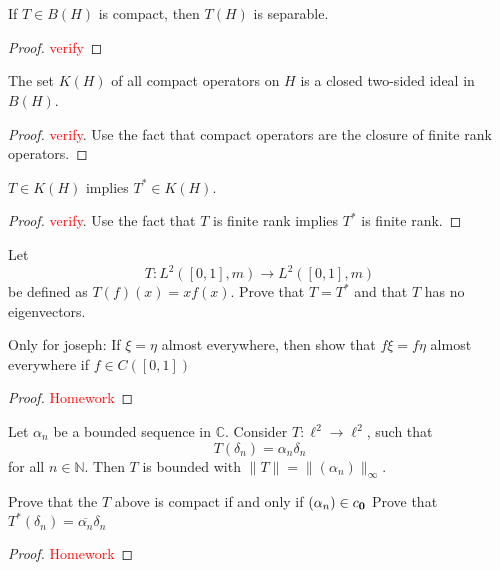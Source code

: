
\chapter{}
\begin{lemma}
  If $T \in B(H)$ is compact, then $T(H)$ is separable.
\end{lemma}
\begin{proof}
  \textcolor{red}{verify}
\end{proof}

\begin{corollary}
  The set $K(H)$ of all compact operators on $  H$ is a closed
  two-sided ideal in $B(H)$.
\end{corollary}
\begin{proof}
  \textcolor{red}{verify}. Use the fact that compact operators are
  the closure of finite rank operators.
\end{proof}

\begin{corollary}
  $T \in K(H)$ implies $T^* \in K(H)$.
\end{corollary}
\begin{proof}
  \textcolor{red}{verify}. Use the fact that $T$ is finite rank
  implies $T^*$ is finite rank.
\end{proof}

\begin{example}
  Let \[
    T: L^2([0, 1], m) \to L^2([0, 1], m)
  \]
  be defined as $T(f)(x) = xf(x)$. Prove that $T = T^*$ and that $T$
  has no eigenvectors.

  Only for joseph: If $\xi = \eta$ almost everywhere, then show that  $f \xi = f
  \eta$ almost everywhere if $ f \in C([0, 1])$
\end{example}
\begin{proof}
  \textcolor{red}{Homework}
\end{proof}

\begin{example}
  Let $\alpha_n$ be a bounded sequence in $\mathbb{C}$. Consider $T :
  \ell^2 \to \ell^2$, such that \[
    T(\delta_n) = \alpha_n \delta_n
  \]
  for all $n \in \mathbb{N}$. Then $T$ is bounded with $\|T\| =
  \|(\alpha_n)\|_\infty$.
\end{example}

\begin{example}
  Prove that the $T$ above is compact if and only if $(\alpha_n) \in c_{\bf 0}$
  Prove that $T^*(\delta_n) = \overline{\alpha_n}\delta_n$
\end{example}
\begin{proof}
  \textcolor{red}{Homework}
\end{proof}

